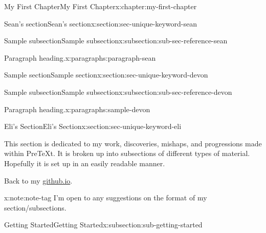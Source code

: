 \documentclass[oneside,10pt,]{book}
\numberwithin{equation}{section}
\begin{document}
\begin{chapterptx}{My First Chapter}{}{My First Chapter}{}{}{x:chapter:my-first-chapter}
\begin{sectionptx}{Sean's section}{}{Sean's section}{}{}{x:section:sec-unique-keyword-sean}
\typeout{************************************************}
%
\begin{subsectionptx}{Sample subsection}{}{Sample subsection}{}{}{x:subsection:sub-sec-reference-sean}
\begin{paragraphs}{Paragraph heading.}{x:paragraphs:paragraph-sean}%
\end{paragraphs}%
\end{subsectionptx}
\end{sectionptx}
%
%
\typeout{************************************************}
\typeout{************************************************}
%
\begin{sectionptx}{Sample section}{}{Sample section}{}{}{x:section:sec-unique-keyword-devon}
%
%
\typeout{************************************************}
\typeout{************************************************}
%
\begin{subsectionptx}{Sample subsection}{}{Sample subsection}{}{}{x:subsection:sub-sec-reference-devon}
\begin{paragraphs}{Paragraph heading.}{x:paragraphs:sample-devon}%
\end{paragraphs}%
\end{subsectionptx}
\end{sectionptx}
%
%
\typeout{************************************************}
\typeout{************************************************}
%
\begin{sectionptx}{Eli's Section}{}{Eli's Section}{}{}{x:section:sec-unique-keyword-eli}
\begin{introduction}{}%
This section is dedicated to my work, discoveries, mishaps, and progressions made within PreTeXt. It is broken up into subsections of different types of material. Hopefully it is set up in an easily readable manner.%
\par
Back to my \href{https://EsromGile.github.io}{github.io}.%
\begin{note}{}{x:note:note-tag}%
I'm open to any suggestions on the format of my section\slash{}subsections.%
\end{note}
\end{introduction}%
%
%
\typeout{************************************************}
\typeout{************************************************}
%
\begin{subsectionptx}{Getting Started}{}{Getting Started}{}{}{x:subsection:sub-getting-started}

\end{subsectionptx}
\end{sectionptx}
\end{chapterptx}
\end{document}
